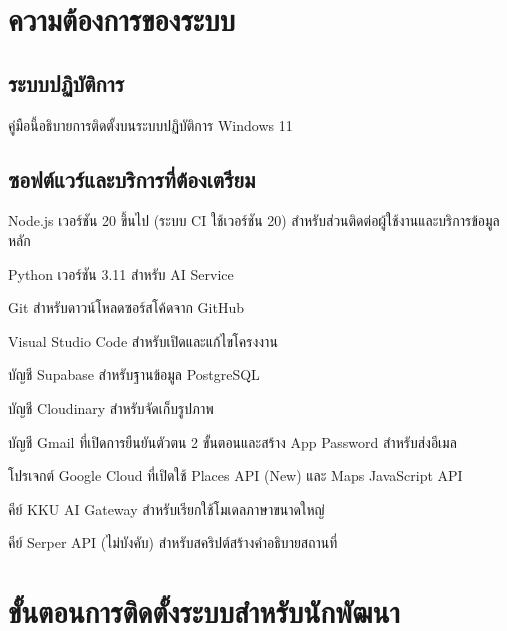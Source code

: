 
\section{ความต้องการของระบบ}

\subsection{ระบบปฏิบัติการ}

คู่มือนี้อธิบายการติดตั้งบนระบบปฏิบัติการ Windows 11

\subsection{ซอฟต์แวร์และบริการที่ต้องเตรียม}

\begin{parenlist}
\item Node.js เวอร์ชัน 20 ขึ้นไป (ระบบ CI ใช้เวอร์ชัน 20) สำหรับส่วนติดต่อผู้ใช้งานและบริการข้อมูลหลัก
\item Python เวอร์ชัน 3.11 สำหรับ AI Service
\item Git สำหรับดาวน์โหลดซอร์สโค้ดจาก GitHub
\item Visual Studio Code สำหรับเปิดและแก้ไขโครงงาน
\item บัญชี Supabase สำหรับฐานข้อมูล PostgreSQL
\item บัญชี Cloudinary สำหรับจัดเก็บรูปภาพ
\item บัญชี Gmail ที่เปิดการยืนยันตัวตน 2 ขั้นตอนและสร้าง App Password สำหรับส่งอีเมล
\item โปรเจกต์ Google Cloud ที่เปิดใช้ Places API (New) และ Maps JavaScript API
\item คีย์ KKU AI Gateway สำหรับเรียกใช้โมเดลภาษาขนาดใหญ่
\item คีย์ Serper API (ไม่บังคับ) สำหรับสคริปต์สร้างคำอธิบายสถานที่
\end{parenlist}

\section{ขั้นตอนการติดตั้งระบบสำหรับนักพัฒนา}

